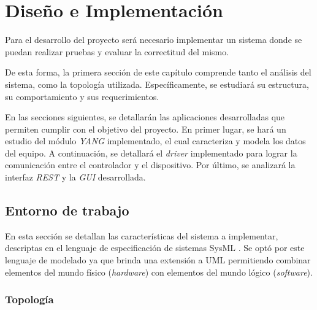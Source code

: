 
\chapter{Diseño e Implementación} %

\label{Chapter4} %
Para el desarrollo del proyecto será necesario implementar un sistema donde se puedan realizar pruebas y evaluar la correctitud del mismo. 

De esta forma, la primera sección de este capítulo comprende tanto el análisis del sistema, como la topología utilizada. Específicamente, se estudiará su estructura, su comportamiento y sus requerimientos. 

En las secciones siguientes, se detallarán las aplicaciones desarrolladas que permiten cumplir con el objetivo del proyecto. En primer lugar, se hará un estudio del módulo \textit{YANG} implementado, el cual caracteriza y modela los datos del equipo. A continuación, se detallará el \textit{driver} implementado para lograr la comunicación entre el controlador y el dispositivo. Por último, se analizará la interfaz \textit{REST} y la \textit{GUI} desarrollada.


\section{Entorno de trabajo}
En esta sección se detallan las características del sistema a implementar, descriptas en el lenguaje de especificación de sistemas SysML \parencite{sysml}. Se optó por este lenguaje de modelado ya que brinda una extensión a UML permitiendo combinar elementos del mundo físico (\textit{hardware}) con elementos del mundo lógico (\textit{software}). 


\subsection{Topología}

